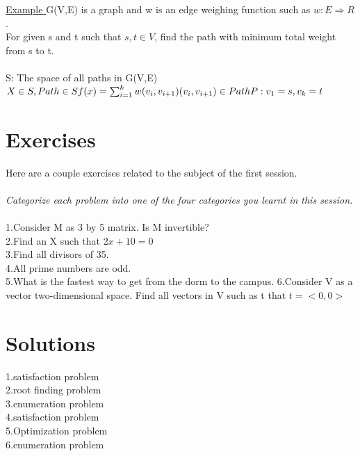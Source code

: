 \documentclass[twocolumn,a4paper, 10pt]{article}
\begin{document}
                    \underline{Example }
                        G(V,E) is a graph and w is an edge weighing function such as \begin{math}
                            w: E\Rightarrow R
                        \end{math}. \\ 
                        For given s and t such that \begin{math}
                            s,t \in V
                        \end{math}, find the path with minimum total weight from s to t. \\ \\ 
                        S: The space of all paths in G(V,E) \\
                        \begin{math}
                            X \in S, Path \in S \\ 
                            f(x) = \sum_{i = 1}^{k} w(v_i,v_{i+1}) \\ 
                            (v_i,v_{i+1}) \in Path \\ 
                            P: v_1 = s,     v_k = t
                        \end{math}

            \clearpage

    \section{Exercises}
        Here are a couple exercises related to the subject of the first session. \\ \\ 
        \emph{Categorize each problem into one of the four categories you learnt in this session.} \\ \\
        1.Consider M as 3 by 5 matrix. Is M invertible? \\
        2.Find an X such that \begin{math}
            2x + 10 = 0
        \end{math} \\ 
        3.Find all divisors of 35. \\ 
        4.All prime numbers are odd. \\ 
        5.What is the fastest way to get from the dorm to the campus.
        6.Consider V as a vector two-dimensional space. Find all vectors in V such as t that \begin{math}
            t = <0,0>
        \end{math} \\ 
        \clearpage
    \section{Solutions}
        1.satisfaction problem \\ 
        2.root finding problem \\ 
        3.enumeration problem \\ 
        4.satisfaction problem \\ 
        5.Optimization problem \\ 
        6.enumeration problem \\
\end{document}
